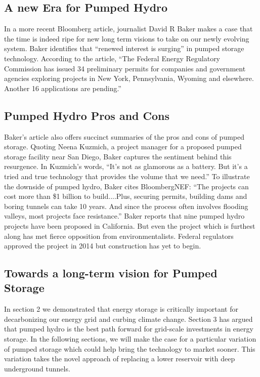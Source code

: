\documentclass[hidelinks,12pt,a4paper]{article}
\begin{document}
\subsection{A new Era for Pumped Hydro}
In a more recent Bloomberg article, journalist David R Baker makes a case that the time is indeed ripe for new long term visions to take on our newly evolving system. Baker identifies that “renewed interest is surging” in pumped storage technology. \cite{QuestforBiggerBatteries} According to the article, “The Federal Energy Regulatory Commission has issued 34 preliminary permits for companies and government agencies exploring projects in New York, Pennsylvania, Wyoming and elsewhere. Another 16 applications are pending.” \cite{QuestforBiggerBatteries}


\subsection{Pumped Hydro Pros and Cons}
Baker's article also offers succinct summaries of the pros and cons of pumped storage. Quoting Neena Kuzmich, a project manager for a proposed pumped storage facility near San Diego, Baker captures the sentiment behind this resurgence. In Kuzmich's words, “It’s not as glamorous as a battery. But it’s a tried and true technology that provides the volume that we need.” To illustrate the downside of pumped hydro, Baker cites BloombergNEF: “The projects can cost more than \$1 billion to build....Plus, securing permits, building dams and boring tunnels can take 10 years. And since the process often involves flooding valleys, most projects face resistance.” Baker reports that nine pumped hydro projects have been proposed in California. But even the project which is furthest along has met fierce opposition from environmentalists. Federal regulators approved the project in 2014 but construction has yet to begin. \cite{QuestforBiggerBatteries}

\subsection{Towards a long-term vision for Pumped Storage}
In section 2 we demonstrated that energy storage is critically important for decarbonizing our energy grid and curbing climate change. Section 3 has argued that pumped hydro is the best path forward for grid-scale investments in energy storage. In the following sections, we will make the case for a particular variation of pumped storage which could help bring the technology to market sooner. This variation takes the novel approach of replacing a lower reservoir with deep underground tunnels.
\end{document}

